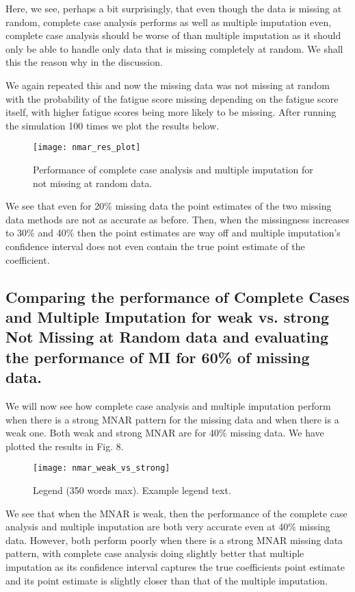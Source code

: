 \documentclass[fleqn,10pt]{wlscirep}\usepackage[]{graphicx}\usepackage[]{color}
\begin{document}
Here, we see, perhaps a bit surprisingly, that even though the data is missing at random, complete case analysis performs as well as multiple imputation even, complete case analysis should be worse of than multiple imputation as it should only be able to handle only data that is missing completely at random. We shall this the reason why in the discussion. 

We again repeated this and now the missing data was not missing at random with the probability of the fatigue score missing depending on the fatigue score itself, with higher fatigue scores being more likely to be missing. After running the simulation 100 times we plot the results below. 

\begin{figure}[H]
\centering
\texttt{[image: nmar\_res\_plot]}
\caption{Performance of complete case analysis and multiple imputation for not missing at random data.}
\label{fig:nmar_res_plot}
\end{figure}

We see that even for 20\% missing data the point estimates of the two missing data methods are not as accurate as before. Then, when the missingness increases to 30\% and 40\% then the point estimates are way off and multiple imputation's confidence interval does not even contain the true point estimate of the coefficient. 


\subsection{Comparing the performance of Complete Cases and Multiple Imputation for weak vs. strong Not Missing at Random data and evaluating the performance of MI for 60\% of missing data.}

We will now see how complete case analysis and multiple imputation perform when there is a strong MNAR pattern for the missing data and when there is a weak one. Both weak and strong MNAR are for 40\% missing data. We have plotted the results in Fig. 8.   

\begin{figure}[H]
\centering
\texttt{[image: nmar\_weak\_vs\_strong]}
\caption{Legend (350 words max). Example legend text.}
\label{fig:nmar_weak_vs_strong}
\end{figure}

We see that when the MNAR is weak, then the performance of the complete case analysis and multiple imputation are both very accurate even at 40\% missing data. However, both perform poorly when there is a strong MNAR missing data pattern, with complete case analysis doing slightly better that multiple imputation as its confidence interval captures the true coefficients point estimate and its point estimate is slightly closer than that of the multiple imputation. 
\end{document}
